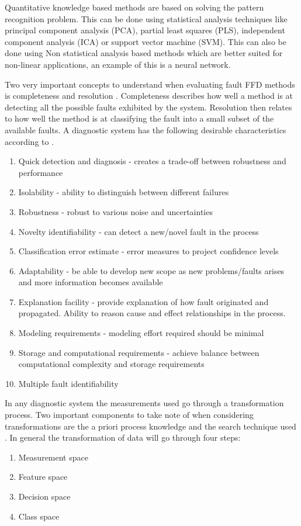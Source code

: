 Quantitative knowledge based methods are based on solving the pattern recognition problem. This can be done using statistical analysis techniques like principal component analysis (PCA), partial least squares (PLS), independent component analysis (ICA) or support vector machine (SVM). This can also be done using Non statistical analysis based methods which are better suited for non-linear applications, an example of this is a neural network.

Two very important concepts to understand when evaluating fault FFD methods is completeness and resolution \cite{venkatasubramanian2003review}. Completeness describes how well a method is at detecting all the possible faults exhibited by the system. Resolution then relates to how well the method is at classifying the fault into a small subset of the available faults. A diagnostic system has the following desirable characteristics according to \cite{venkatasubramanian2003review}.
\begin{enumerate}
	\item Quick detection and diagnosis - creates a trade-off between robustness and performance
	\item Isolability - ability to distinguish between different failures
	\item Robustness - robust to various noise and uncertainties
	\item Novelty identifiability - can detect a new/novel fault in the process
	\item Classification error estimate - error measures to project confidence levels
	\item Adaptability - be able to develop new scope as new problems/faults arises and more information becomes available
	\item Explanation facility - provide explanation of how fault originated and propagated. Ability to reason cause and effect relationships in the process.
	\item Modeling requirements - modeling effort required should be minimal
	\item Storage and computational requirements - achieve balance between computational complexity and storage requirements
	\item Multiple fault identifiability	
\end{enumerate}

In any diagnostic system the measurements used go through a transformation process. Two important components to take note of when considering transformations are the a priori process knowledge and the search technique used \cite{venkatasubramanian2003review}. In general the transformation of data will go through four steps:
\begin{enumerate}
	\item Measurement space
	\item Feature space
	\item Decision space
	\item Class space	
\end{enumerate}

